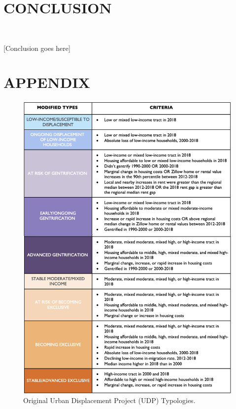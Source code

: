 \documentclass[12pt]{article}
\begin{document}

\part{CONCLUSION}\

{\color{red}[Conclusion goes here]}

\clearpage
\part{APPENDIX}

\begin{figure}%
  \centering %
  \includegraphics[height=0.95\textheight]{images/typology_sheet_2018}
  \captionsetup{justification=centering, singlelinecheck=false, margin=2cm}
  \caption[UDP Displacement Typologies]{Original Urban Displacement Project (UDP) Typologies.}
  \label{fig:original_udp}
\end{figure}
\end{document}
